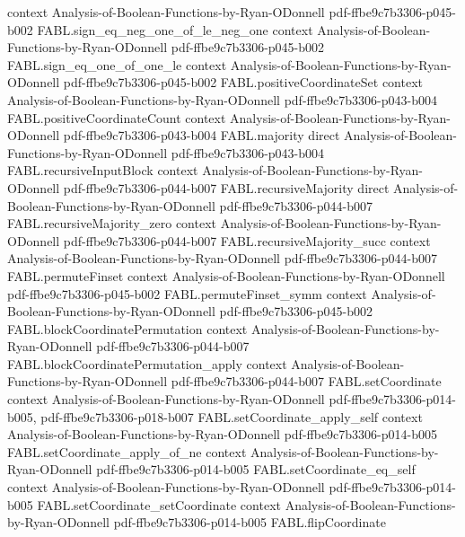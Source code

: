 \begin{theorem}
  {context}
  {Analysis-of-Boolean-Functions-by-Ryan-ODonnell}
  {pdf-ffbe9c7b3306-p045-b002}
\proofstep
  {FABL.sign_eq_neg_one_of_le_neg_one}
  {context}
  {Analysis-of-Boolean-Functions-by-Ryan-ODonnell}
  {pdf-ffbe9c7b3306-p045-b002}
\proofstep
  {FABL.sign_eq_one_of_one_le}
  {context}
  {Analysis-of-Boolean-Functions-by-Ryan-ODonnell}
  {pdf-ffbe9c7b3306-p045-b002}
\proofstep
  {FABL.positiveCoordinateSet}
  {context}
  {Analysis-of-Boolean-Functions-by-Ryan-ODonnell}
  {pdf-ffbe9c7b3306-p043-b004}
\proofstep
  {FABL.positiveCoordinateCount}
  {context}
  {Analysis-of-Boolean-Functions-by-Ryan-ODonnell}
  {pdf-ffbe9c7b3306-p043-b004}
\proofstep
  {FABL.majority}
  {direct}
  {Analysis-of-Boolean-Functions-by-Ryan-ODonnell}
  {pdf-ffbe9c7b3306-p043-b004}
\proofstep
  {FABL.recursiveInputBlock}
  {context}
  {Analysis-of-Boolean-Functions-by-Ryan-ODonnell}
  {pdf-ffbe9c7b3306-p044-b007}
\proofstep
  {FABL.recursiveMajority}
  {direct}
  {Analysis-of-Boolean-Functions-by-Ryan-ODonnell}
  {pdf-ffbe9c7b3306-p044-b007}
\proofstep
  {FABL.recursiveMajority_zero}
  {context}
  {Analysis-of-Boolean-Functions-by-Ryan-ODonnell}
  {pdf-ffbe9c7b3306-p044-b007}
\proofstep
  {FABL.recursiveMajority_succ}
  {context}
  {Analysis-of-Boolean-Functions-by-Ryan-ODonnell}
  {pdf-ffbe9c7b3306-p044-b007}
\proofstep
  {FABL.permuteFinset}
  {context}
  {Analysis-of-Boolean-Functions-by-Ryan-ODonnell}
  {pdf-ffbe9c7b3306-p045-b002}
\proofstep
  {FABL.permuteFinset_symm}
  {context}
  {Analysis-of-Boolean-Functions-by-Ryan-ODonnell}
  {pdf-ffbe9c7b3306-p045-b002}
\proofstep
  {FABL.blockCoordinatePermutation}
  {context}
  {Analysis-of-Boolean-Functions-by-Ryan-ODonnell}
  {pdf-ffbe9c7b3306-p044-b007}
\proofstep
  {FABL.blockCoordinatePermutation_apply}
  {context}
  {Analysis-of-Boolean-Functions-by-Ryan-ODonnell}
  {pdf-ffbe9c7b3306-p044-b007}
\proofstep
  {FABL.setCoordinate}
  {context}
  {Analysis-of-Boolean-Functions-by-Ryan-ODonnell}
  {pdf-ffbe9c7b3306-p014-b005,
    pdf-ffbe9c7b3306-p018-b007}
\proofstep
  {FABL.setCoordinate_apply_self}
  {context}
  {Analysis-of-Boolean-Functions-by-Ryan-ODonnell}
  {pdf-ffbe9c7b3306-p014-b005}
\proofstep
  {FABL.setCoordinate_apply_of_ne}
  {context}
  {Analysis-of-Boolean-Functions-by-Ryan-ODonnell}
  {pdf-ffbe9c7b3306-p014-b005}
\proofstep
  {FABL.setCoordinate_eq_self}
  {context}
  {Analysis-of-Boolean-Functions-by-Ryan-ODonnell}
  {pdf-ffbe9c7b3306-p014-b005}
\proofstep
  {FABL.setCoordinate_setCoordinate}
  {context}
  {Analysis-of-Boolean-Functions-by-Ryan-ODonnell}
  {pdf-ffbe9c7b3306-p014-b005}
\proofstep
  {FABL.flipCoordinate}

\end{theorem}
